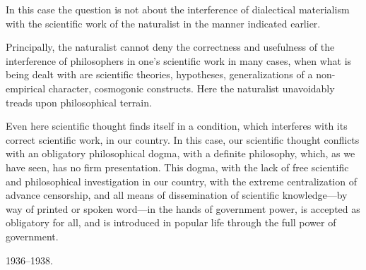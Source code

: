 In this case the question is not about the interference of dialectical
materialism with the scientific work of the naturalist in the manner indicated
earlier.

Principally, the naturalist cannot deny the correctness and usefulness of the
interference of philosophers in one's scientific work in many cases, when what
is being dealt with are scientific theories, hypotheses, generalizations of a
non-empirical character, cosmogonic constructs.  Here the naturalist
unavoidably treads upon philosophical terrain.

Even here scientific thought finds itself in a condition, which interferes with
its correct scientific work, in our country.  In this case, our scientific
thought conflicts with an obligatory philosophical dogma, with a definite
philosophy, which, as we have seen, has no firm presentation.  This dogma, with
the lack of free scientific and philosophical investigation in our country,
with the extreme centralization of advance censorship, and all means of
dissemination of scientific knowledge---by way of printed or spoken word---in
the hands of government power, is accepted as obligatory for all, and is
introduced in popular life through the full power of government.

\begin{flushright}
								   1936--1938.
\end{flushright}
